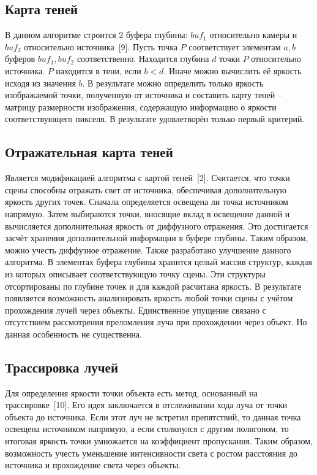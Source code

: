 {    \subsection{Карта теней} {
        В данном алгоритме строится 2 буфера глубины:
        $buf_1$ относительно камеры и $buf_2$ относительно источника~[9].
        Пусть точка $P$ соответствует элементам $a, b$
        буферов $buf_1, buf_2$ соответственно.
        Находится глубина $d$ точки $P$ относительно источника.
        $P$ находится в тени, если $b < d$.
        Иначе можно вычислить её яркость исходя из значения $b$.
        В результате можно определить только яркость изображаемой точки, полученную от источника и составить карту теней -- матрицу размерности изображения,
        содержащую информацию о яркости соответствующего пикселя.
        В результате удовлетворён только первый критерий.
    }
    \subsection{Отражательная карта теней} {
        Является модификацией алгоритма с картой теней~[2].
        Считается, что точки сцены способны отражать свет от источника, обеспечивая
        дополнительную яркость других точек.
        Сначала определяется освещена ли точка источником напрямую.
        Затем выбираются точки, вносящие вклад в освещение данной и вычисляется
        дополнительная яркость от диффузного отражения.
        Это достигается засчёт хранения дополнительной информации в буфере глубины.
        Таким образом, можно учесть диффузное отражение.
        Также разработано улучшение данного алгоритма.
        В элементах буфера глубины хранится целый массив структур, каждая из которых
        описывает соответствующую точку сцены.
        Эти структуры отсортированы по глубине точек и для каждой расчитана яркость.
        В результате появляется возможность анализировать яркость любой точки сцены
        с учётом прохождения лучей через объекты.
        Единственное упущение связано с отсутствием рассмотрения преломления
        луча при прохождении через объект.
        Но данная особенность не существенна.
    }

    \subsection {Трассировка лучей} {
        Для определения яркости точки объекта есть метод, основанный на
        трассировке~[10].
        Его идея заключается в отслеживании хода луча от точки объекта до
        источника.
        Если этот луч не встретил препятствий, то данная точка освещена
        источником напрямую, а если столкнулся с другим полигоном, то итоговая
        яркость точки умножается на коэффициент пропускания.
        Таким образом, возможность учесть уменьшение интенсивности света с
        ростом расстояния до источника и прохождение света через объекты.
    }

}
